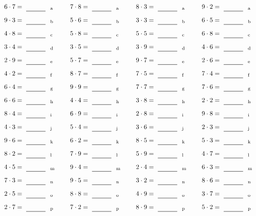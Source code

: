\documentclass
[
  draft    = true,
  fontsize = 11pt,
  parskip  = half-
]
{scrartcl}
\begin{document}
\par\vfill\par
\begin{align*}
    \pline{6\cdot7}&=\rline{a}
  & \pline{7\cdot8}&=\rline{a}
  & \pline{8\cdot3}&=\rline{a}
  & \pline{9\cdot2}&=\rline{a} \\[1ex]
    \pline{9\cdot3}&=\rline{b}
  & \pline{5\cdot6}&=\rline{b}
  & \pline{3\cdot3}&=\rline{b}
  & \pline{6\cdot5}&=\rline{b} \\[1ex]
    \pline{4\cdot8}&=\rline{c}
  & \pline{5\cdot8}&=\rline{c}
  & \pline{5\cdot5}&=\rline{c}
  & \pline{6\cdot8}&=\rline{c} \\[1ex]
    \pline{3\cdot4}&=\rline{d}
  & \pline{3\cdot5}&=\rline{d}
  & \pline{3\cdot9}&=\rline{d}
  & \pline{4\cdot6}&=\rline{d} \\[1ex]
    \pline{2\cdot9}&=\rline{e}
  & \pline{5\cdot7}&=\rline{e}
  & \pline{9\cdot7}&=\rline{e}
  & \pline{2\cdot6}&=\rline{e} \\[1ex]
    \pline{4\cdot2}&=\rline{f}
  & \pline{8\cdot7}&=\rline{f}
  & \pline{7\cdot5}&=\rline{f}
  & \pline{7\cdot4}&=\rline{f} \\[1ex]
    \pline{6\cdot4}&=\rline{g}
  & \pline{9\cdot9}&=\rline{g}
  & \pline{7\cdot7}&=\rline{g}
  & \pline{7\cdot6}&=\rline{g} \\[1ex]
    \pline{6\cdot6}&=\rline{h}
  & \pline{4\cdot4}&=\rline{h}
  & \pline{3\cdot8}&=\rline{h}
  & \pline{2\cdot2}&=\rline{h} \\[1ex]
    \pline{8\cdot4}&=\rline{i}
  & \pline{6\cdot9}&=\rline{i}
  & \pline{2\cdot8}&=\rline{i}
  & \pline{9\cdot8}&=\rline{i} \\[1ex]
    \pline{4\cdot3}&=\rline{j}
  & \pline{5\cdot4}&=\rline{j}
  & \pline{3\cdot6}&=\rline{j}
  & \pline{2\cdot3}&=\rline{j} \\[1ex]
    \pline{9\cdot6}&=\rline{k}
  & \pline{6\cdot2}&=\rline{k}
  & \pline{8\cdot5}&=\rline{k}
  & \pline{5\cdot3}&=\rline{k} \\[1ex]
    \pline{8\cdot2}&=\rline{l}
  & \pline{7\cdot9}&=\rline{l}
  & \pline{5\cdot9}&=\rline{l}
  & \pline{4\cdot7}&=\rline{l} \\[1ex]
    \pline{4\cdot5}&=\rline{m}
  & \pline{9\cdot4}&=\rline{m}
  & \pline{2\cdot4}&=\rline{m}
  & \pline{6\cdot3}&=\rline{m} \\[1ex]
    \pline{7\cdot3}&=\rline{n}
  & \pline{9\cdot5}&=\rline{n}
  & \pline{3\cdot2}&=\rline{n}
  & \pline{8\cdot6}&=\rline{n} \\[1ex]
    \pline{2\cdot5}&=\rline{o}
  & \pline{8\cdot8}&=\rline{o}
  & \pline{4\cdot9}&=\rline{o}
  & \pline{3\cdot7}&=\rline{o} \\[1ex]
    \pline{2\cdot7}&=\rline{p}
  & \pline{7\cdot2}&=\rline{p}
  & \pline{8\cdot9}&=\rline{p}
  & \pline{5\cdot2}&=\rline{p}
\end{align*}
\end{document}
